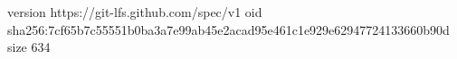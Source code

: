 version https://git-lfs.github.com/spec/v1
oid sha256:7cf65b7c55551b0ba3a7e99ab45e2acad95e461c1e929e62947724133660b90d
size 634
